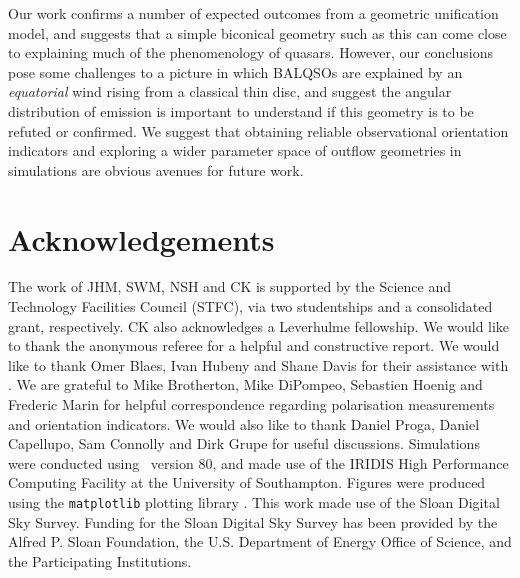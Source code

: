 \documentclass[useAMS,usenatbib]{mn2e_x}
\begin{document}
Our work confirms a number of expected outcomes from a geometric unification 
model, and suggests that a simple biconical geometry such as this can come close to 
explaining much of the  phenomenology of quasars. However, our conclusions pose 
some challenges to a picture in which BALQSOs are
explained by an {\em equatorial} wind rising from a classical thin disc, and suggest 
the angular distribution of emission is important to understand if this 
geometry is to be refuted or confirmed. We suggest that obtaining reliable 
observational orientation indicators and 
exploring a wider parameter space of outflow geometries in simulations
are obvious avenues for future work.


\section*{Acknowledgements}

The work of JHM, SWM, NSH and CK is supported by the
Science and Technology Facilities Council (STFC),
via two studentships and a consolidated grant, respectively.
CK also acknowledges a Leverhulme fellowship.
We would like to thank the anonymous referee for a helpful
and constructive report.
We would like to thank Omer Blaes, Ivan Hubeny and Shane Davis for their
assistance with \agn. We are grateful to Mike Brotherton, Mike DiPompeo,
Sebastien Hoenig and Frederic Marin for helpful correspondence regarding
polarisation measurements and orientation indicators.
We would also like to thank Daniel Proga, Daniel Capellupo, Sam Connolly and
Dirk Grupe for useful discussions.  Simulations were conducted using \py\ version 80,
and made use of the IRIDIS High Performance Computing Facility at the
University of Southampton. Figures were produced using the {\tt matplotlib} 
plotting library \citep{matplotlib}. This work made use of the Sloan Digital Sky Survey.
Funding for the Sloan Digital Sky Survey has been provided by
the Alfred P. Sloan Foundation, the U.S. Department of Energy Office of
Science, and the Participating Institutions.


\setlength{\bibsep}{0pt}

\end{document}
